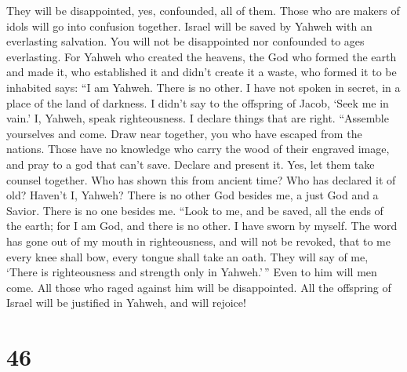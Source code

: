 They will be disappointed, yes, confounded, all of them.
Those who are makers of idols will go into confusion together.
 Israel will be saved by Yahweh with an everlasting
salvation. You will not be disappointed nor confounded to ages
everlasting.  For Yahweh who created the heavens, the God
who formed the earth and made it, who established it and didn't create
it a waste, who formed it to be inhabited says: ``I am Yahweh. There is
no other.  I have not spoken in secret, in a place of the
land of darkness. I didn't say to the offspring of Jacob, `Seek me in
vain.' I, Yahweh, speak righteousness. I declare things that are right.
 ``Assemble yourselves and come. Draw near together, you
who have escaped from the nations. Those have no knowledge who carry the
wood of their engraved image, and pray to a god that can't save.
 Declare and present it. Yes, let them take counsel
together. Who has shown this from ancient time? Who has declared it of
old? Haven't I, Yahweh? There is no other God besides me, a just God and
a Savior. There is no one besides me.  ``Look to me, and be
saved, all the ends of the earth; for I am God, and there is no other.
 I have sworn by myself. The word has gone out of my mouth
in righteousness, and will not be revoked, that to me every knee shall
bow, every tongue shall take an oath.  They will say of me,
`There is righteousness and strength only in Yahweh.'\,'' Even to him
will men come. All those who raged against him will be disappointed.
 All the offspring of Israel will be justified in Yahweh,
and will rejoice!

\hypertarget{section-44}{%
\section{46}\label{section-44}}

